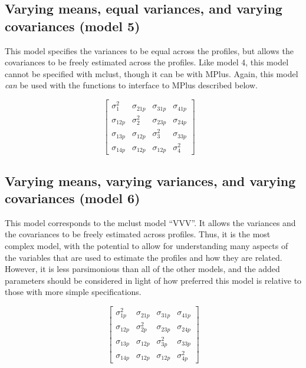 \documentclass[]{book}
\theoremstyle{definition}
\theoremstyle{definition}
\theoremstyle{definition}
\theoremstyle{remark}
\begin{document}
\subsection{Varying means, equal variances, and varying covariances
(model
5)}\label{varying-means-equal-variances-and-varying-covariances-model-5}

This model specifies the variances to be equal across the profiles, but
allows the covariances to be freely estimated across the profiles. Like
model 4, this model cannot be specified with mclust, though it can be
with MPlus. Again, this model \emph{can} be used with the functions to
interface to MPlus described below.

\[
\left[ \begin{matrix} { \sigma }_{ 1 }^{ 2 } & { \sigma }_{ 21p } & { \sigma }_{ 31p } & { \sigma }_{ 41p } \\ { \sigma }_{ 12p } & { \sigma }_{ 2 }^{ 2 } & { \sigma }_{ 23p } & { \sigma }_{ 24p } \\ { \sigma }_{ 13p } & { \sigma }_{ 12p } & { \sigma }_{ 3 }^{ 2 } & { \sigma }_{ 33p } \\ { \sigma }_{ 14p } & { \sigma }_{ 12p } & { \sigma }_{ 12p } & { \sigma }_{ 4 }^{ 2 } \end{matrix} \right] \quad 
\]

\subsection{Varying means, varying variances, and varying covariances
(model
6)}\label{varying-means-varying-variances-and-varying-covariances-model-6}

This model corresponds to the mclust model ``VVV''. It allows the
variances and the covariances to be freely estimated across profiles.
Thus, it is the most complex model, with the potential to allow for
understanding many aspects of the variables that are used to estimate
the profiles and how they are related. However, it is less parsimonious
than all of the other models, and the added parameters should be
considered in light of how preferred this model is relative to those
with more simple specifications.

\[
\left[ \begin{matrix} { \sigma }_{ 1p }^{ 2 } & { \sigma }_{ 21p } & { \sigma }_{ 31p } & { \sigma }_{ 41p } \\ { \sigma }_{ 12p } & { \sigma }_{ 2p }^{ 2 } & { \sigma }_{ 23p } & { \sigma }_{ 24p } \\ { \sigma }_{ 13p } & { \sigma }_{ 12p } & { \sigma }_{ 3p }^{ 2 } & { \sigma }_{ 33p } \\ { \sigma }_{ 14p } & { \sigma }_{ 12p } & { \sigma }_{ 12p } & { \sigma }_{ 4p }^{ 2 } \end{matrix} \right] 
\]
\end{document}
